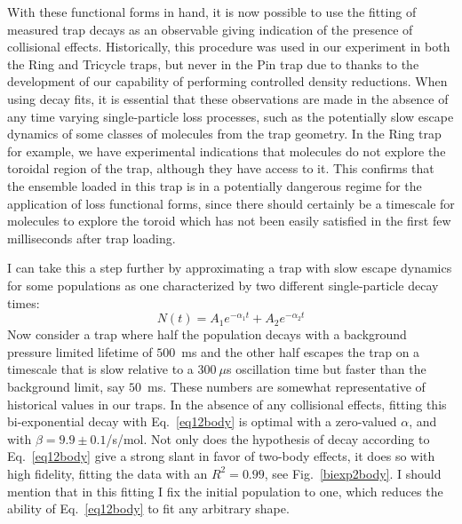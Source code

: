 With these functional forms in hand, it is now possible to use the fitting of measured trap decays as an observable giving indication of the presence of collisional effects.
Historically, this procedure was used in our experiment in both the Ring and Tricycle traps, but never in the Pin trap due to thanks to the development of our capability of performing controlled density reductions.
When using decay fits, it is essential that these observations are made in the absence of any time varying single-particle loss processes, such as the potentially slow escape dynamics of some classes of molecules from the trap geometry.
In the Ring trap for example, we have experimental indications that molecules do not explore the toroidal region of the trap, although they have access to it.
This confirms that the ensemble loaded in this trap is in a potentially dangerous regime for the application of loss functional forms, since there should certainly be a timescale for molecules to explore the toroid which has not been easily satisfied in the first few milliseconds after trap loading.

I can take this a step further by approximating a trap with slow escape dynamics for some populations as one characterized by two different single-particle decay times:
\begin{equation}
N(t)=A_1e^{-\alpha_1 t} + A_2e^{-\alpha_2 t}
\end{equation}
Now consider a trap where half the population decays with a background pressure limited lifetime of $500$~ms and the other half escapes the trap on a timescale that is slow relative to a $300~\mu$s oscillation time but faster than the background limit, say $50$~ms.
These numbers are somewhat representative of historical values in our traps.
In the absence of any collisional effects, fitting this bi-exponential decay with Eq.~\ref{eq12body} is optimal with a zero-valued $\alpha$, and with $\beta=9.9\pm0.1$/s/mol. 
Not only does the hypothesis of decay according to Eq.~\ref{eq12body} give a strong slant in favor of two-body effects, it does so with high fidelity, fitting the data with an $R^2=0.99$, see Fig.~\ref{biexp2body}.
I should mention that in this fitting I fix the initial population to one, which reduces the ability of Eq.~\ref{eq12body} to fit any arbitrary shape.


